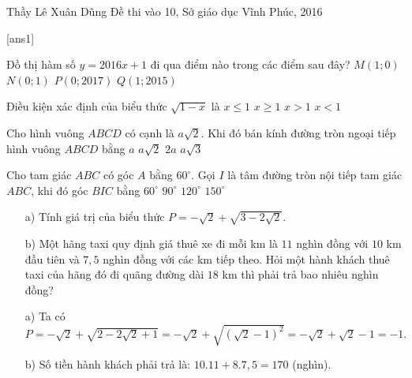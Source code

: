 \begin{name}
{Thầy  Lê Xuân Dũng}
{Đề thi vào 10, Sở giáo dục Vĩnh Phúc, 2016}
\end{name}
\setcounter{ex}{0}
[ans1]
\begin{ex}%
Đồ thị hàm số $y=2016x+1$ đi qua điểm nào trong các điểm sau đây?
\choice
{$M(1;0)$}
{\True $N(0;1)$}
{$P(0;2017)$}
{$Q(1;2015)$}
\end{ex}

\begin{ex}%
Điều kiện xác định của biểu thức $\sqrt{1-x}$ là
\choice
{$ x \le 1$}
{\True $ x\ge 1$}
{$x > 1$}
{$x<1$}
\end{ex}

\begin{ex}%
Cho hình vuông $ABCD$ có cạnh là  $a\sqrt{2}$. Khi đó bán kính đường tròn ngoại tiếp hình vuông $ABCD$ bằng
\choice
{\True $ a$}
{$a\sqrt{2}$}
{$2a$}
{$a\sqrt{3}$}
\end{ex}

\begin{ex}%
Cho tam giác $ABC$ có góc $A$ bằng $60^\circ$. Gọi $I$ là tâm đường tròn nội tiếp tam giác $ABC$, khi đó góc $BIC$ bằng
\choice
{$60^\circ$}
{$90^\circ$}
{\True $120^\circ$}
{$150^\circ$}
\end{ex}

\begin{ex}%
\hfill

      \begin{enumerate}
        \item[a)] Tính giá trị của biểu thức $P=-\sqrt{2}+\sqrt{3-2\sqrt{2}}.$
        \item[b)] Một hãng taxi quy định giá thuê xe đi mỗi km là $11$ nghìn đồng với $10$ km đầu tiên và $7,5$ nghìn đồng với các km tiếp theo. Hỏi một hành khách thuê taxi của hãng đó đi quãng đường dài $18$ km thì phải trả bao nhiêu nghìn đồng?
        \end{enumerate}
\loigiai
    {
    \begin{enumerate}
        \item[a)] Ta có $P = -\sqrt{2}+\sqrt{2-2\sqrt{2}+1} = -\sqrt{2}+\sqrt{(\sqrt{2}-1)^2} = -\sqrt{2}+\sqrt{2}-1 = -1.$
        \item[b)] Số tiền hành khách phải trả là: $10 .11 + 8 . 7,5  = 170$ (nghìn).
     \end{enumerate}
    }
\end{ex}

